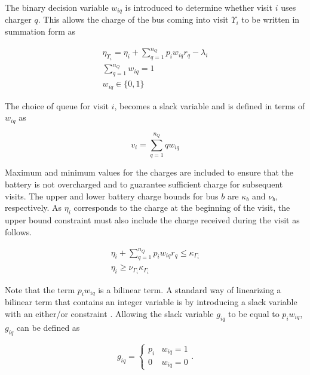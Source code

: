 \documentclass[utf8]{FrontiersinHarvard}
\let\cite\citep                                                                 %
\begin{document}
The binary decision variable $w_{iq}$ is introduced to determine whether visit $i$ uses charger $q$. This allows the
charge of the bus coming into visit $\Upsilon_i$ to be written in summation form as

\begin{subequations}
    \label{subeq:pre_next_charge}
\begin{align}
    \eta_{\Upsilon_i} = \eta_i + \sum_{q=1}^{n_Q} p_i w_{iq} r_q - \lambda_i  \\
    \sum_{q=1}^{n_Q} w_{iq} = 1 \\
    w_{iq} \in \{0,1\}
\end{align}
\end{subequations}

The choice of queue for visit $i$, becomes a slack variable and is defined in terms of $w_{iq}$ as

\begin{equation}
    v_i = \sum_{q=1}^{n_Q} qw_{iq}
\end{equation}

Maximum and minimum values for the charges are included to ensure that the battery is not overcharged and to guarantee
sufficient charge for subsequent visits. The upper and lower battery charge bounds for bus $b$ are $\kappa_b$ and $\nu_b$,
respectively. As $\eta_i$ corresponds to the charge at the beginning of the visit, the upper bound constraint must also
include the charge received during the visit as follows.

\begin{subequations}
    \label{subeq:pre_min_max}
\begin{align}
    \eta_i + \sum_{q=1}^{n_Q} p_i w_{iq} r_q \leq \kappa_{\Gamma_i}                 \\
    \eta_i \geq \nu_{\Gamma_i} \kappa_{\Gamma_i}
\end{align}
\end{subequations}

Note that the term $p_i w_{iq}$ is a bilinear term. A standard way of linearizing a bilinear term that contains an
integer variable is by introducing a slack variable with an either/or constraint \cite{Chen2010,Rodriguez2013}. Allowing
the slack variable $g_{iq}$ to be equal to $p_i w_{iq}$, $g_{iq}$ can be defined as

\begin{equation}
    \label{eq:giq_cases}
    g_{iq} =
    \begin{cases}
        p_i & w_{iq} = 1 \\
        0 & w_{iq} = 0
    \end{cases}.
\end{equation}
\end{document}
